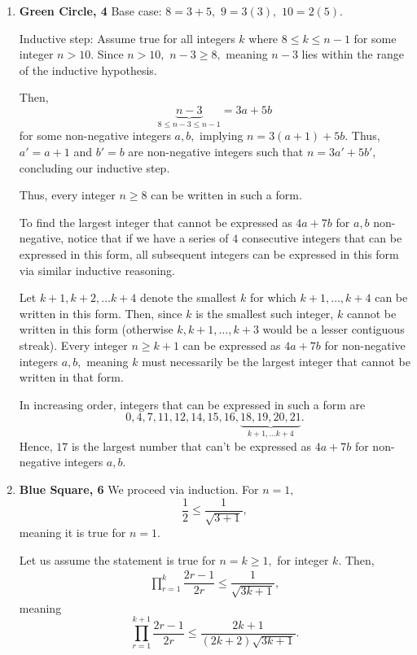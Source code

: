 \documentclass[12pt]{article}
\begin{document}
\begin{enumerate}
  \item \textbf{Green Circle, 4} Base case: $8 = 3 + 5,$ $9 = 3(3),$
    $10 = 2(5).$

    Inductive step: Assume true for all integers $k$ where $8 \leq k
    \leq n - 1$ for some integer $n > 10.$ Since $n > 10,$ $n - 3
    \geq 8,$ meaning $n - 3$ lies within the range of the inductive hypothesis.

    Then, $$\underbrace{n - 3}_{8 \leq n -3 \leq n - 1} = 3a + 5b$$
    for some non-negative integers $a, b,$ implying $n = 3(a + 1) +
    5b.$ Thus, $a' = a + 1$ and $b' = b$ are non-negative integers
    such that $n = 3a' + 5b',$ concluding our inductive step.

    Thus, every integer $n \geq 8$ can be written in such a form.

    To find the largest integer that cannot be expressed as $4a + 7b$
    for $a, b$ non-negative, notice that if we have a series of $4$
    consecutive integers that can be expressed in this form, all
    subsequent integers can be expressed in this form via similar
    inductive reasoning.

    Let $k + 1, k + 2, \ldots k + 4$ denote the smallest $k$ for
    which $k + 1, \ldots, k + 4$ can be written in this form. Then,
    since $k$ is the smallest such integer, $k$ cannot be written in
    this form (otherwise $k, k +1, \ldots, k + 3$ would be a lesser
    contiguous streak). Every integer $n \geq k + 1$ can be expressed
    as $4a + 7b$ for non-negative integers $a, b,$ meaning $k$ must
    necessarily be the largest integer that cannot be written in that form.

    In increasing order, integers that can be expressed in such a
    form are $$0, 4, 7, 11, 12, 14, 15, 16, \underbrace{18, 19, 20,
    21}_{k +1 , \ldots k + 4}.$$ Hence, $17$ is the largest number
    that can't be expressed as $4a + 7b$ for non-negative integers $a, b.$

  \item \textbf{Blue Square, 6} We proceed via induction. For $n = 1,$
    $$
    \dfrac{1}{2} \leq \dfrac{1}{\sqrt{3 + 1}},
    $$
    meaning it is true for $n = 1.$

    Let us assume the statement is true for $n = k \geq 1,$ for
    integer $k.$ Then,
    \begin{align*}
      \prod_{r = 1}^{k} \dfrac{2r - 1}{2r} \leq \dfrac{1}{\sqrt{3k + 1}},
    \end{align*}
    meaning $$
    \prod_{r = 1}^{ k+ 1} \dfrac{2r - 1}{2r} \leq \dfrac{2k + 1}{(2k
    + 2)\sqrt{3k + 1}}.
    $$


\end{enumerate}
\end{document}
